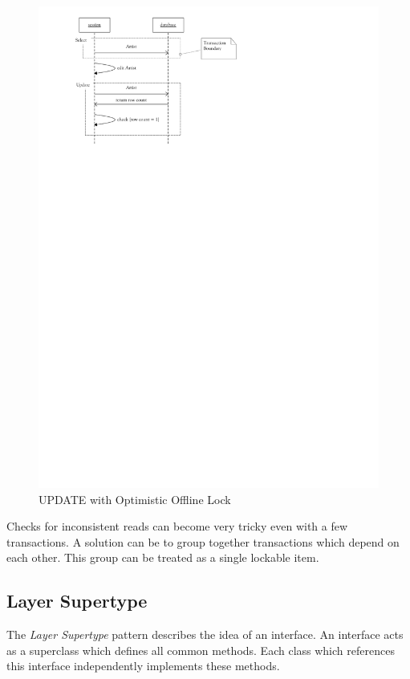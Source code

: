 			\begin{figure}[htb]
				\begin{center}
					\includegraphics{./files/inc/figures/patternsOfflineLock}
					\caption{\label{fig:patternsOfflineLock} UPDATE with Optimistic Offline Lock}
				\end{center}
			\end{figure}
			Checks for inconsistent reads can become very tricky even with a few transactions. A 
			solution can be to group together transactions which depend on each other. This group 
			can be treated as a single lockable item.
			
		\subsection{Layer Supertype}
		\label{subsec:layerSupertype}
			The \textit{Layer Supertype} pattern describes the idea of an interface. An interface acts
			as a superclass which defines all common methods. Each class which references this 
			interface independently implements these methods.

